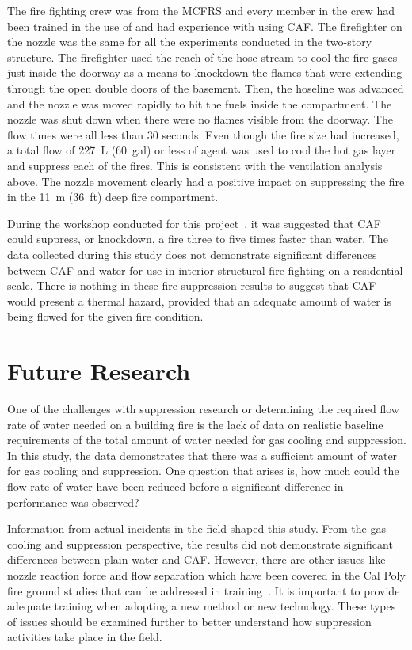 \documentclass[12pt,oneside]{book}
\begin{document}
The fire fighting crew was from the MCFRS and every member in the crew had been trained in the use of and had experience with using CAF. The firefighter on the nozzle was the same for all the experiments conducted in the two-story structure. The firefighter used the reach of the hose stream to cool the fire gases just inside the doorway as a means to knockdown the flames that were extending through the open double doors of the basement. Then, the hoseline was advanced and the nozzle was moved rapidly to hit the fuels inside the compartment. The nozzle was shut down when there were no flames visible from the doorway. The flow times were all less than 30 seconds. Even though the fire size had increased, a total flow of 227~L (60~gal) or less of agent was used to cool the hot gas layer and suppress each of the fires. This is consistent with the ventilation analysis above. The nozzle movement clearly had a positive impact on suppressing the fire in the 11~m (36~ft) deep fire compartment.    

During the workshop conducted for this project~\cite{Grant:2011}, it was suggested that CAF could suppress, or knockdown, a fire three to five times faster than water. The data collected during this study does not demonstrate significant differences between CAF and water for use in interior structural fire fighting on a residential scale. There is nothing in these fire suppression results to suggest that CAF would present a thermal hazard, provided that an adequate amount of water is being flowed for the given fire condition.

\section{Future Research}

One of the challenges with suppression research or determining the required flow rate of water needed on a building fire is the lack of data on realistic baseline requirements of the total amount of water needed for gas cooling and suppression. In this study, the data demonstrates that there was a sufficient amount of water for gas cooling and suppression. One question that arises is, how much could the flow rate of water have been reduced before a significant difference in performance was observed? 

Information from actual incidents in the field shaped this study. From the gas cooling and suppression perspective, the results did not demonstrate significant differences between plain water and CAF. However, there are other issues like nozzle reaction force and flow separation which have been covered in the Cal Poly fire ground studies that can be addressed in training~\cite{Carracino:2013,Dicus:2013,LaPolla:2012}.  It is important to provide adequate training when adopting a new method or new technology. These types of issues should be examined further to better understand how suppression activities take place in the field.
\end{document}
